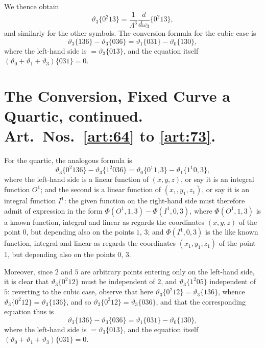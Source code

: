 \documentclass[11pt,a4paper]{book}
\begin{document}
\newpage
\begin{art}\label{art:63}
We thence obtain
\[
\vartheta_3\{0^2 13\} = \frac{1}{\Lambda^3}\frac{d}{d\omega_3}\{0^2 13\},
\]
and similarly for the other symbols. The conversion formula for the cubic case is
\[
\vartheta_3\{136\} - \vartheta_3\{036\} = \vartheta_1\{031\} - \vartheta_0\{130\},
\]
where the left-hand side is $= \vartheta_3\{013\}$, and the equation itself $(\vartheta_0 + \vartheta_1 + \vartheta_3)\{031\} = 0$.
\end{art}

\section*{The Conversion, Fixed Curve a Quartic, continued. Art.~Nos.~\ref{art:64} to \ref{art:73}.}

\begin{art}\label{art:64}
For the quartic, the analogous formula is
\[
\vartheta_3\{0^2 136\} - \vartheta_3\{1^2 036\} = \vartheta_0\{0^1 1, 3\} - \vartheta_1\{1^1 0, 3\},
\]
where the left-hand side is a linear function of $(x, y, z)$, or say it is an integral function $O^1$; and the second is a linear function of $(x_1, y_1, z_1)$, or say it is an integral function $I^1$: the given function on the right-hand side must therefore admit of expression in the form $\Phi(O^1, 1, 3) - \Phi(I^1, 0, 3)$, where $\Phi(O^1, 1, 3)$ is a known function, integral and linear as regards the coordinates $(x, y, z)$ of the point $0$, but depending also on the points $1$, $3$; and $\Phi(I^1, 0, 3)$ is the like known function, integral and linear as regards the coordinates $(x_1, y_1, z_1)$ of the point $1$, but depending also on the points $0$, $3$.
\end{art}

\newpage
Moreover, since $2$ and $5$ are arbitrary points entering only on the left-hand side, it is clear that $\vartheta_3\{0^2 12\}$ must be independent of $2$, and $\vartheta_3\{1^2 05\}$ independent of $5$: reverting to the cubic case, observe that here $\vartheta_3\{0^2 12\} = \vartheta_3\{136\}$, whence $\vartheta_3\{0^2 12\} = \vartheta_3\{136\}$, and so $\vartheta_3\{0^2 12\} = \vartheta_3\{036\}$, and that the corresponding equation thus is
\[
\vartheta_3\{136\} - \vartheta_3\{036\} = \vartheta_1\{031\} - \vartheta_0\{130\},
\]
where the left-hand side is $= \vartheta_3\{013\}$, and the equation itself $(\vartheta_0 + \vartheta_1 + \vartheta_3)\{031\} = 0$.
\end{document}
